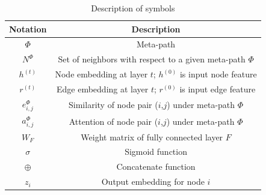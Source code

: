 \begin{table}[]
\caption{Description of symbols}
\centering
\begin{tabular}{cc}
\hline
Notation       & Description                                                       \\ \hline
$\Phi$         & Meta-path                                                         \\
$N^\Phi$       & Set of neighbors with respect to a given meta-path $\Phi$          \\
$h^{(t)}$        & Node embedding at layer $t$; $h^{(0)}$ is input node feature \\
$r^{(t)}$        & Edge embedding at layer $t$; $r^{(0)}$ is input edge feature \\
$e_{i,j}^\Phi$ & Similarity of node pair ($i$,$j$) under meta-path $\Phi$   \\
$a_{i,j}^\Phi$ & Attention of node pair ($i$,$j$) under meta-path $\Phi$    \\
$W_F$          & Weight matrix of fully connected layer $F$          \\
$\sigma$       & Sigmoid function                                                  \\
$\oplus$       & Concatenate function \\
$z_i$            & Output embedding for node $i$                                     \\
\hline
\end{tabular}
\label{table:notation}
\end{table}











